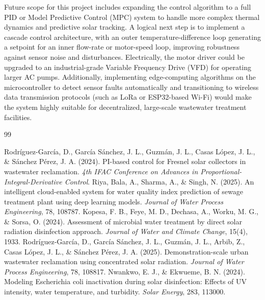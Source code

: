 \documentclass[12pt,a4paper]{report}
\begin{document}
Future scope for this project includes expanding the control algorithm to a full PID or Model Predictive Control (MPC) system to handle more complex thermal dynamics and predictive solar tracking. A logical next step is to implement a cascade control architecture, with an outer temperature-difference loop generating a setpoint for an inner flow-rate or motor-speed loop, improving robustness against sensor noise and disturbances. Electrically, the motor driver could be upgraded to an industrial-grade Variable Frequency Drive (VFD) for operating larger AC pumps. Additionally, implementing edge-computing algorithms on the microcontroller to detect sensor faults automatically and transitioning to wireless data transmission protocols (such as LoRa or ESP32-based Wi-Fi) would make the system highly suitable for decentralized, large-scale wastewater treatment facilities.

\renewcommand{\bibname}{References}

\begin{thebibliography}{99}
\small
\setlength{\itemsep}{0pt}
\setlength{\parskip}{0pt}
 Rodríguez-García, D., García Sánchez, J. L., Guzmán, J. L., Casas López, J. L., \& Sánchez Pérez, J. A. (2024). PI-based control for Fresnel solar collectors in wastewater reclamation. \textit{4th IFAC Conference on Advances in Proportional-Integral-Derivative Control}.
 Riya, Bala, A., Sharma, A., \& Singh, N. (2025). An intelligent cloud-enabled system for water quality index prediction of sewage treatment plant using deep learning models. \textit{Journal of Water Process Engineering}, 78, 108787.
 Kopesa, F. B., Feye, M. D., Dechasa, A., Worku, M. G., \& Sorsa, O. (2024). Assessment of microbial water treatment by direct solar radiation disinfection approach. \textit{Journal of Water and Climate Change}, 15(4), 1933.
 Rodríguez-García, D., García Sánchez, J. L., Guzmán, J. L., Arbib, Z., Casas López, J. L., \& Sánchez Pérez, J. A. (2025). Demonstration-scale urban wastewater reclamation using concentrated solar radiation. \textit{Journal of Water Process Engineering}, 78, 108817.
 Nwankwo, E. J., \& Ekwueme, B. N. (2024). Modeling Escherichia coli inactivation during solar disinfection: Effects of UV intensity, water temperature, and turbidity. \textit{Solar Energy}, 283, 113000.
\end{thebibliography}
\end{document}
